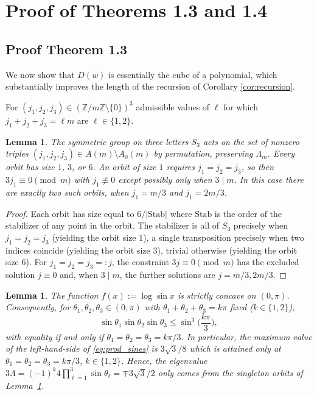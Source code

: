 \documentclass[11pt,reqno]{amsart}
\newtheorem{lemma}[theorem]{Lemma}
\theoremstyle{remark}
\begin{document}
\section{Proof of Theorems 1.3 and 1.4}
\label{sec:cubesection}

\subsection{Proof Theorem 1.3}

We now show that $D(w)$ is essentially the cube of a polynomial, which substantially improves
the length of the recursion of Corollary \ref{cor:recursion}.

For $(j_1,j_2,j_3)\in(\mathbb Z/m\mathbb Z \setminus \{0\})^3$ admissible values of $\ell$ for which $j_1+j_2+j_3=\ell m$ are $\ell\in\{1,2\}$.

\begin{lemma}
\label{lem:orbit-sizes} The symmetric group on three letters
$S_3$ acts on the set of nonzero triples $(j_1,j_2,j_3)\in A(m)\setminus A_0(m)$
by permutation, preserving $\Lambda_{m}$. Every orbit has size $1$, $3$, or
$6$. An orbit of size $1$ requires $j_1=j_2=j_3$, so then
$3j_1\equiv0\pmod m$ with $j_1\not\equiv0$ except possibly only when
$3\mid m$.  In this case there are exactly two such orbits, when
$j_1=m/3$ and $j_1=2m/3$.
\end{lemma}

\begin{proof}
Each orbit has size equal to $6/|\mathrm{Stab}|$ where $\mathrm{Stab}$ is the
order of the stabilizer of any point in the orbit.
The stabilizer is all of $S_3$ precisely when $j_1=j_2=j_3$ (yielding
the orbit size $1$), a single transposition precisely when two indices coincide
(yielding the orbit size $3$), trivial otherwise (yielding the orbit size $6$). For
$j_1=j_2=j_3=:j$, the constraint $3j\equiv0\pmod m$ has the excluded
solution $j\equiv0$ and, when $3\mid m$, the further solutions are
$j=m/3,2m/3$.
\end{proof}

\begin{lemma}
\label{lem:concavity}
The function $f(x):=\log\sin x$ is strictly concave on $(0,\pi)$.
Consequently, for $\theta_1,\theta_2,\theta_3\in(0,\pi)$ with
$\theta_1+\theta_2+\theta_3=k\pi$ fixed ($k\in\{1,2\}$),
\begin{equation}\label{eq:prod_sines}
\sin\theta_1\sin\theta_2\sin\theta_3 \le \sin^3\Big(\frac{k\pi}{3}\Big),
\end{equation}
with equality if and only if $\theta_1=\theta_2=\theta_3=k\pi/3$. In particular,
the maximum value of the left-hand-side of \eqref{eq:prod_sines} is $3\sqrt3/8$ which
 is attained only at $\theta_1=\theta_2=\theta_3=k\pi/3$, $k\in\{1,2\}$.  Hence, the eigenvalue $3\Lambda=(-1)^k4\prod_{\ell=1}^3 \sin\theta_\ell=\mp3\sqrt3/2$ only comes from the singleton orbits
of Lemma~\ref{lem:orbit-sizes}.
\end{lemma}
\end{document}
